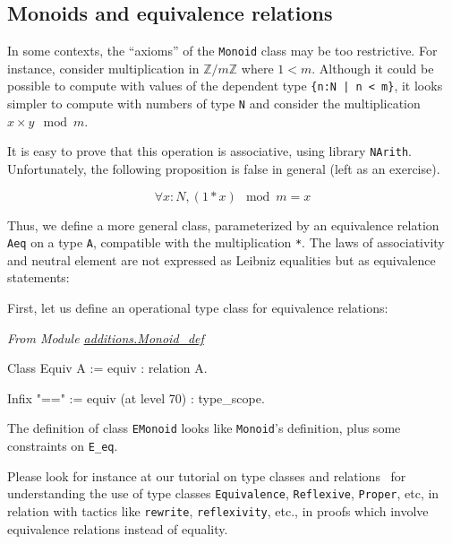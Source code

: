 \subsection{Monoids and equivalence relations}

In some contexts, the ``axioms'' of the \texttt{Monoid} class  may be too restrictive.
For instance, consider multiplication in $\mathds{Z}/m\mathds{Z}$ where
 $1<m$.
Although it could be possible to compute with values of the dependent 
type \texttt{\{n:N | n < m\}}, 
it looks simpler to compute with numbers of type
\texttt{N} and consider the multiplication $x \times y \mod{m}$.



It is easy to prove that this operation is associative, using library \texttt{NArith}. Unfortunately, the following proposition is false in general (left as an exercise).

$$\forall x:N, (1 * x) \mod{m} = x$$


Thus, we define a more general class, parameterized by an equivalence
relation \texttt{Aeq}  on a type \texttt{A}, compatible with the multiplication \texttt{*}. The laws of associativity and neutral element
are not expressed as Leibniz equalities but as equivalence statements:

First, let us define an operational type class for equivalence relations:

\vspace{4pt}

\noindent
\emph{From Module \href{../theories/html/additions.Monoid_def.html}{additions.Monoid\_def}}

\begin{Coqsrc}
Class Equiv A := equiv : relation A.

Infix "==" := equiv (at level 70) : type_scope.
\end{Coqsrc}

The definition of class \texttt{EMonoid} looks like \texttt{Monoid}'s definition, 
plus some constraints on \texttt{E\_eq}.

Please look for instance at our tutorial on type classes and relations~\cite{PCMS} 
for understanding the use of  type classes \texttt{Equivalence}, \texttt{Reflexive}, \texttt{Proper}, etc, in relation with tactics like \texttt{rewrite}, \texttt{reflexivity}, etc., in proofs which involve  equivalence relations instead of equality.

\label{EMonoid-def}

